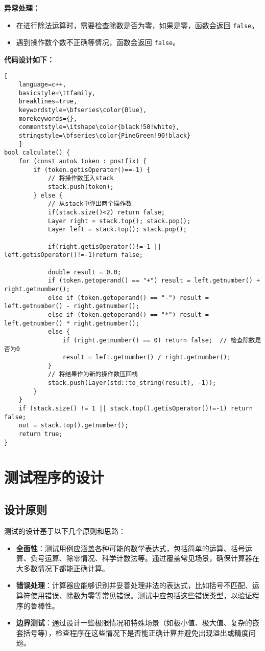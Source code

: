 \documentclass[UTF8]{ctexart}
\begin{document}
\textbf{异常处理：}
\begin{itemize}
    \item 在进行除法运算时，需要检查除数是否为零，如果是零，函数会返回 \texttt{false}。
    \item 遇到操作数个数不正确等情况，函数会返回 \texttt{false}。
\end{itemize}

\textbf{代码设计如下：}
\begin{lstlisting}[ 
    language=c++,
    basicstyle=\ttfamily,
    breaklines=true,
    keywordstyle=\bfseries\color{Blue}, 
    morekeywords={}, 
    commentstyle=\itshape\color{black!50!white},
    stringstyle=\bfseries\color{PineGreen!90!black} 
    ]
bool calculate() {
    for (const auto& token : postfix) {
        if (token.getisOperator()==-1) {
            // 将操作数压入stack
            stack.push(token);
        } else {
            // 从stack中弹出两个操作数
            if(stack.size()<2) return false;
            Layer right = stack.top(); stack.pop();
            Layer left = stack.top(); stack.pop();

            if(right.getisOperator()!=-1 || left.getisOperator()!=-1)return false;

            double result = 0.0;
            if (token.getoperand() == "+") result = left.getnumber() + right.getnumber();
            else if (token.getoperand() == "-") result = left.getnumber() - right.getnumber();
            else if (token.getoperand() == "*") result = left.getnumber() * right.getnumber();
            else {
                if (right.getnumber() == 0) return false;  // 检查除数是否为0
                result = left.getnumber() / right.getnumber();
            }
            // 将结果作为新的操作数压回栈
            stack.push(Layer(std::to_string(result), -1));
        }
    }
    if (stack.size() != 1 || stack.top().getisOperator()!=-1) return false;
    out = stack.top().getnumber();
    return true;
}
\end{lstlisting}

\section{测试程序的设计}
\subsection{设计原则}
测试的设计基于以下几个原则和思路：

\begin{itemize}
    \item \textbf{全面性}：测试用例应涵盖各种可能的数学表达式，包括简单的运算、括号运算、负号运算、除零情况、科学计数法等。通过覆盖常见场景，确保计算器在大多数情况下都能正确计算。
    \item \textbf{错误处理}：计算器应能够识别并妥善处理非法的表达式，比如括号不匹配、运算符使用错误、除数为零等常见错误。测试中应包括这些错误类型，以验证程序的鲁棒性。
    \item \textbf{边界测试}：通过设计一些极限情况和特殊场景（如极小值、极大值、复杂的嵌套括号等），检查程序在这些情况下是否能正确计算并避免出现溢出或精度问题。
\end{itemize}
\end{document}
